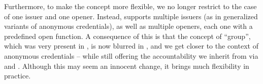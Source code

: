 Furthermore, to make the concept more flexible, we no longer restrict to the
case of one issuer and one opener. Instead, \UAS supports multiple issuers (as
in generalized variants of anonymous credentials), as well as multiple openers,
each one with a predefined open function. 
A consequence of this is that the concept of ``group'', which was very present
in \GSAC, is now blurred in \UAS, and we get closer to the context of anonymous
credentials -- while still offering the accountability we inherit from \GSAC
via \Open and \Judge.
%
Although this may seem an innocent change, it brings much flexibility in
practice.






